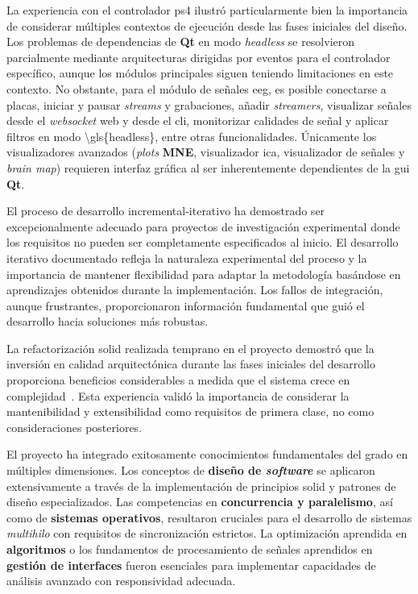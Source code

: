 La experiencia con el controlador \acrshort{ps4} ilustró particularmente bien la importancia de considerar múltiples contextos de ejecución desde las fases iniciales del diseño. Los problemas de dependencias de \textbf{Qt} en modo \textit{\gls{headless}} se resolvieron parcialmente mediante arquitecturas dirigidas por eventos para el controlador específico, aunque los módulos principales siguen teniendo limitaciones en este contexto. No obstante, para el módulo de señales \acrshort{eeg}, es posible conectarse a placas, iniciar y pausar \textit{\glspl{stream}} y grabaciones, añadir \textit{streamers}, visualizar señales desde el \textit{\gls{websocket}} web y desde el \acrshort{cli}, monitorizar calidades de señal y aplicar filtros en modo \acrshort{\gls{headless}}, entre otras funcionalidades. Únicamente los visualizadores avanzados (\textit{plots} \textbf{MNE}, visualizador \acrshort{ica}, visualizador de señales y \textit{brain map}) requieren interfaz gráfica al ser inherentemente dependientes de la \acrshort{gui} \textbf{Qt}.

El proceso de desarrollo incremental-iterativo ha demostrado ser excepcionalmente adecuado para proyectos de investigación experimental donde los requisitos no pueden ser completamente especificados al inicio. El desarrollo iterativo documentado refleja la naturaleza experimental del proceso y la importancia de mantener flexibilidad para adaptar la metodología basándose en aprendizajes obtenidos durante la implementación. Los fallos de integración, aunque frustrantes, proporcionaron información fundamental que guió el desarrollo hacia soluciones más robustas.

La refactorización \acrshort{solid} realizada temprano en el proyecto demostró que la inversión en calidad arquitectónica durante las fases iniciales del desarrollo proporciona beneficios considerables a medida que el sistema crece en complejidad~\cite{martin2003agile}. Esta experiencia validó la importancia de considerar la mantenibilidad y extensibilidad como requisitos de primera clase, no como consideraciones posteriores.

El proyecto ha integrado exitosamente conocimientos fundamentales del grado en múltiples dimensiones. Los conceptos de \textbf{diseño de \textit{software}} se aplicaron extensivamente a través de la implementación de principios \acrshort{solid} y patrones de diseño especializados. Las competencias en \textbf{concurrencia y paralelismo}, así como de \textbf{sistemas operativos}, resultaron cruciales para el desarrollo de sistemas \textit{multihilo} con requisitos de sincronización estrictos. La optimización aprendida en \textbf{algoritmos} o los fundamentos de procesamiento de señales aprendidos en \textbf{gestión de interfaces} fueron esenciales para implementar capacidades de análisis avanzado con responsividad adecuada.

